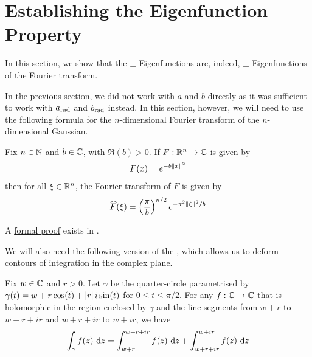 \section{Establishing the Eigenfunction Property}
\label{Ch4:Sec:Eig}


In this section, we show that the $\pm$-Eigenfunctions are, indeed, $\pm$-Eigenfunctions of the Fourier transform.

In the previous section, we did not work with $a$ and $b$ directly as it was sufficient to work with $a_{\operatorname{rad}}$ and $b_{\operatorname{rad}}$ instead. In this section, however, we will need to use the following formula for the $n$-dimensional Fourier transform of the $n$-dimensional Gaussian.

\begin{boxtheorem}\label{Ch4:Thm:GaussianFourier}
    Fix $n \in \mathbb{N}$ and $b \in \mathbb{C}$, with $\Re(b) > 0$. If $F : \mathbb{R}^n \to \mathbb{C}$ is given by
    \begin{align*}
        F(x) = e^{-b \left\lVert x \right\rVert^2}
    \end{align*}
    then for all $\xi \in \mathbb{R}^n$, the Fourier transform of $F$ is given by
    \begin{align*}
        \widehat{F}\!\left( \xi \right) = \left( \frac{\pi}{b} \right)^{{n} / {2}} e^{{- \pi^2 \left\lVert \xi \right\rVert^2} / {b}}
    \end{align*}
\end{boxtheorem}
A \href{https://github.com/leanprover-community/mathlib4/blob/5a2eaa85c555c4263e15928cef249cbaad2eb2d2/Mathlib/Analysis/SpecialFunctions/Gaussian/FourierTransform.lean#L360-L363}{formal proof} exists in \mathlib.

We will also need the following version of the \CGT, which allows us to deform contours of integration in the complex plane.

\begin{boxtheorem}\label{Ch4:Thm:CGTRectCircle}
    Fix $w \in \mathbb{C}$ and $r > 0$. Let $\gamma$ be the quarter-circle parametrised by $\gamma(t) = w + r\cos\!{\left( t \right)} + \left\lvert r \right\rvert i \sin\!{\left( t \right)}$ for $0 \leq t \leq \pi/2$. For any $f : \mathbb{C} \to \mathbb{C}$ that is holomorphic in the region enclosed by $\gamma$ and the line segments from $w + r$ to $w + r + ir$ and $w + r + ir$ to $w + ir$, we have
    \begin{align*}
        \int_{\gamma} f(z) \, \operatorname{d}\!{z}
        = \int_{w + r}^{w + r + ir} f(z) \, \operatorname{d}\!{z} + \int_{w + r + ir}^{w + ir} f(z) \, \operatorname{d}\!{z}
    \end{align*}
\end{boxtheorem}

